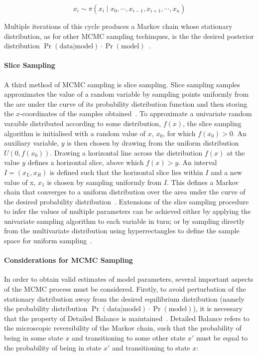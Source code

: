 \begin{equation}
x_i \sim \pi(x_i \mid x_0, \cdots, x_{i-1}, x_{i+1}, \cdots, x_n)
\label{eq:gibbs}
\end{equation} 

Multiple iterations of this cycle produces a Markov chain whose stationary distribution, as for other MCMC sampling techinques, is the the desired posterior distribution $\Pr(\text{data}|\text{model}) \cdot \Pr(\text{model})$~\cite{gelman1995}.

\paragraph{Slice Sampling}
A third method of MCMC sampling is slice sampling. Slice sampling samples approximates the value of a random variable by sampling points uniformly from the are under the curve of its probability distribution function and then storing the $x$-coordinates of the samples obtained~\cite{Neal2003}. To approximate a univariate random varaible distributed according to some distribution, $f(x)$, the slice sampling algorithm is initialised with a random value of $x$, $x_0$, for which $f(x_0) > 0$. An auxiliary variable, $y$ is then chosen by drawing from the uniform distribution $U(0, f(x_0))$. Drawing a horizontal line across the distribution $f(x)$ at the value $y$ defines a horizontal slice, above which $f(x) > y$. An interval $I = (x_L, x_R)$ is defined such that the horizontal slice lies within $I$ and a new value of x, $x_1$ is chosen by sampling uniformly from $I$. This defines a Markov chain that converges to a uniform distribution over the area under the curve of the desired probability distribution~\cite{Neal2003}. Extensions of the slice sampling procedure to infer the values of multiple parameters can be achieved either by applying the univariate sampling algorithm to each variable in turn; or by sampling directly from the multivariate distribution using hyperrectangles to define the sample space for uniform sampling~\cite{Neal2003}. 

\paragraph{Considerations for MCMC Sampling}
In order to obtain valid estimates of model parameters, several important aspects of the MCMC process must be considered. Firstly, to avoid perturbation of the stationary distribution away from the desired equilibrium distribution (namely the probability distribution $\Pr(\text{data}|\text{model}) \cdot \Pr(\text{model})$), it is necessary that the property of Detailed Balance is maintained~\cite{???}. Detailed Balance refers to the microscopic reversibility of the Markov chain, such that the probability of being in some state $x$ and transitioning to some other state $x'$ must be equal to the probability of being in state $x'$ and transitioning to state $x$:

